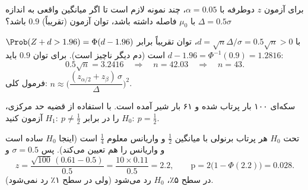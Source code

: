 \begin{exercise}
برای آزمون $z$ دوطرفه با $\alpha=0.05$، چند نمونه لازم است تا اگر میانگین واقعی به اندازه $\Delta=0.5\sigma$ با $\mu_0$ فاصله داشته باشد، توان آزمون (تقریباً) $0.9$ باشد؟
\end{exercise}
\begin{solution}
با $d=\sqrt n\Delta/\sigma=0.5\sqrt n>0$، توان تقریباً برابر $\Prob(Z+d>1.96)=\Phi(d-1.96)$ است (دم دیگر ناچیز است). برای توان $0.9$ باید $d-1.96=\Phi^{-1}(0.9)=1.2816$:
\[
0.5\sqrt n=3.2416\quad\Rightarrow\quad n=42.03\quad\Rightarrow\quad n=43 .
\]
فرمول کلی: $n\approx\Big(\dfrac{(z_{\alpha/2}+z_\beta)\,\sigma}{\Delta}\Big)^2$.
\end{solution}

\begin{exercise}
سکه‌ای ۱۰۰ بار پرتاب شده و ۶۱ بار شیر آمده است. با استفاده از قضیه حد مرکزی، $H_0:\ p=\frac12$ را در برابر $H_1:\ p\neq\frac12$ آزمون کنید.
\end{exercise}
\begin{solution}
تحت $H_0$ هر پرتاب برنولی با میانگین $\frac12$ و واریانس معلوم $\frac14$ است (اینجا $H_0$ ساده است و واریانس را هم تعیین می‌کند). پس $\sigma=0.5$ و
\[
z=\frac{\sqrt{100}\,(0.61-0.5)}{0.5}=\frac{10\times0.11}{0.5}=2.2,\qquad\text{p}=2\big(1-\Phi(2.2)\big)=0.028 .
\]
در سطح ۵٪، $H_0$ رد می‌شود (ولی در سطح ۱٪ رد نمی‌شود).
\end{solution}
